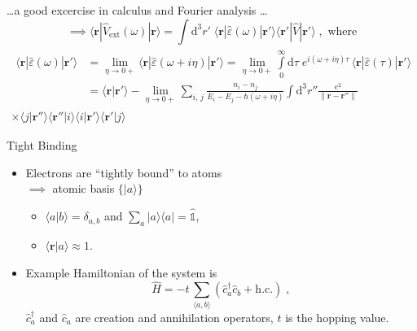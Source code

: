\documentclass{beamer}
\begin{document}
\begin{frame}
    \dots a good excercise in calculus and Fourier analysis \dots
    \[ \implies \langle \mathbf{r} | \hat V_\text{ext}(\omega) | \mathbf{r} \rangle = \int\!\! \text{d}^3 r' \; \langle \mathbf{r} | \hat \varepsilon(\omega) | \mathbf{r'} \rangle \langle \mathbf{r'} | \hat V | \mathbf{r'} \rangle \; , \text{ where} 
    \]
    \vspace{-1.0cm}
    \begin{multline*}
        \begin{aligned}
        \langle \mathbf{r} | \hat \varepsilon(\omega) | \mathbf{r'} \rangle 
            &= \lim_{\eta \to 0+} \langle \mathbf{r} | \hat\varepsilon(\omega + i\eta) | \mathbf{r'} \rangle = \lim_{\eta \to 0+} \int\limits_{0}^{\infty} \!\! \text{d}\tau \; e^{i (\omega +i\eta) \tau}\,\langle \mathbf{r} | \hat\varepsilon(\tau) | \mathbf{r'} \rangle \\
            &= \langle \mathbf{r} | \mathbf{r'} \rangle - \lim_{\eta \to 0+} \sum_{i,\,j} \frac{n_i - n_j}{E_i \!-\! E_j - \hbar(\omega \!+\! i\eta)} \int\!\! \text{d}^3 r'' \frac{e^2}{\| \mathbf{r} - \mathbf{r''} \|}
        \end{aligned} \\
        \times \langle j |\mathbf{r''}\rangle \langle\mathbf{r''} | i \rangle \langle i | \mathbf{r'}\rangle \langle \mathbf{r'} | j \rangle
    \end{multline*}
\end{frame}

\begin{frame}{Tight Binding}
    \begin{itemize}
    \item<1-> Electrons are ``tightly bound'' to atoms \\
        $\implies$ \alert{atomic basis $\{|a\rangle\}$}
        \begin{itemize}
        \item $\langle a|b \rangle = \delta_{a,b}$ \hspace{0.5cm} and \hspace{0.5cm} $\sum_a |a\rangle \langle a | = \hat{\mathds{1}}$,
        \item $\langle \mathbf{r} | a \rangle \approx 1$.
        \end{itemize}
    \item<2-> Example Hamiltonian of the system is
        \[ \hat H = -t \,\sum_{\langle a, b \rangle} (\hat c_a^\dagger \hat c_b + \text{h.c.})\;,\]
        $\hat c^\dagger_a$ and $\hat c_a$ are creation and annihilation operators, $t$ is the \alert{hopping value}.
    \end{itemize}
\end{frame}
\end{document}

